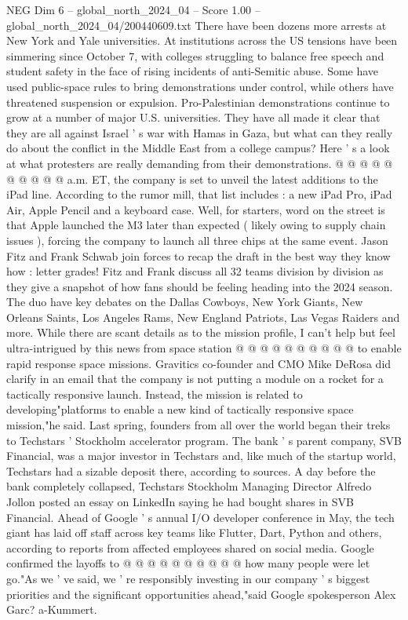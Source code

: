 \begin{textsample}{NEG Dim 6 – global\_north\_2024\_04 – Score 1.00 – global\_north\_2024\_04/200440609.txt}
There have been dozens more arrests at New York and Yale universities.
At institutions across the US tensions have been simmering since October 7, with colleges struggling to balance free speech and student safety in the face of rising incidents of anti-Semitic abuse.
Some have used public-space rules to bring demonstrations under control, while others have threatened suspension or expulsion.
Pro-Palestinian demonstrations continue to grow at a number of major U.S. universities.
They have all made it clear that they are all against Israel ' s war with Hamas in Gaza, but what can they really do about the conflict in the Middle East from a college campus?
Here ' s a look at what protesters are really demanding from their demonstrations. @ @ @ @ @ @ @ @ @ @ a.m.
ET, the company is set to unveil the latest additions to the iPad line.
According to the rumor mill, that list includes : a new iPad Pro, iPad Air, Apple Pencil and a keyboard case.
Well, for starters, word on the street is that Apple launched the M3 later than expected ( likely owing to supply chain issues ), forcing the company to launch all three chips at the same event.
Jason Fitz and Frank Schwab join forces to recap the draft in the best way they know how : letter grades!
Fitz and Frank discuss all 32 teams division by division as they give a snapshot of how fans should be feeling heading into the 2024 season.
The duo have key debates on the Dallas Cowboys, New York Giants, New Orleans Saints, Los Angeles Rams, New England Patriots, Las Vegas Raiders and more.
While there are scant details as to the mission profile, I can't help but feel ultra-intrigued by this news from space station @ @ @ @ @ @ @ @ @ @ to enable rapid response space missions.
Gravitics co-founder and CMO Mike DeRosa did clarify in an email that the company is not putting a module on a rocket for a tactically responsive launch.
Instead, the mission is related to developing"platforms to enable a new kind of tactically responsive space mission,"he said.
Last spring, founders from all over the world began their treks to Techstars ' Stockholm accelerator program.
The bank ' s parent company, SVB Financial, was a major investor in Techstars and, like much of the startup world, Techstars had a sizable deposit there, according to sources.
A day before the bank completely collapsed, Techstars Stockholm Managing Director Alfredo Jollon posted an essay on LinkedIn saying he had bought shares in SVB Financial.
Ahead of Google ' s annual I/O developer conference in May, the tech giant has laid off staff across key teams like Flutter, Dart, Python and others, according to reports from affected employees shared on social media.
Google confirmed the layoffs to @ @ @ @ @ @ @ @ @ @ how many people were let go."As we ' ve said, we ' re responsibly investing in our company ' s biggest priorities and the significant opportunities ahead,"said Google spokesperson Alex Garc? a-Kummert.

\end{textsample}
